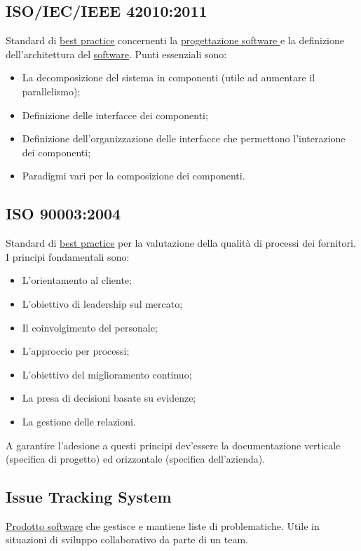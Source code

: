	\subsection{ISO/IEC/IEEE 42010:2011}
	\label{sec:iso12207}
	Standard di \underline{\hyperref[sec:bestpractice]{best practice}} concernenti la \underline{\hyperref[sec:progettazionesoftware]{progettazione software }} e la definizione dell'architettura del \underline{\hyperref[sec:prodottosoftware]{software}}. Punti essenziali sono:
	\begin{itemize}
	\item La decomposizione del sistema in componenti (utile ad aumentare il parallelismo);
	\item Definizione delle interfacce dei componenti;
	\item Definizione dell'organizzazione delle interfacce che permettono l'interazione dei componenti;
	\item Paradigmi vari per la composizione dei componenti.
	\end{itemize}


	\subsection{ISO 90003:2004}
	\label{sec:iso90003}
	Standard di \underline{\hyperref[sec:bestpractice]{best practice}} per la valutazione della qualità di processi dei fornitori. I principi fondamentali sono:
	\begin{itemize}
	\item L'orientamento al cliente;
	\item L'obiettivo di leadership sul mercato;
	\item Il coinvolgimento del personale;
	\item L'approccio per processi;
	\item L'obiettivo del miglioramento continuo;
	\item La presa di decisioni basate su evidenze;
	\item La gestione delle relazioni.
	\end{itemize}
	A garantire l'adesione a questi principi dev'essere la documentazione verticale (specifica di progetto) ed orizzontale (specifica dell'azienda).


	\subsection{Issue Tracking System}
	\label{sec:issuetrack}
	\underline{\hyperref[sec:prodottosoftware]{Prodotto software}} che gestisce e mantiene liste di problematiche. Utile in situazioni di sviluppo collaborativo da parte di un team.


